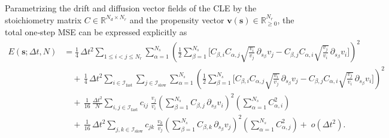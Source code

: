 \documentclass{article}
\begin{document}






Parametrizing the drift and diffusion vector fields of the CLE by the stoichiometry matrix
$C\in\mathbb{R}^{N_d\times N_r}$ and the propensity vector
$\pmb{v}(\pmb{s})\in\mathbb{R}_{\ge 0}^{N_r}$, the total one‑step MSE can be expressed explicitly as
\begin{equation}
\begin{aligned}
E(\pmb{s};\Delta t,N)&=
\frac14\,\Delta t^2
\sum_{1\le i<j\le N_r}
\sum_{\alpha=1}^{N_s}
\left(
\frac12\sum_{\beta=1}^{N_s}
\Big[
   C_{\beta,i}C_{\alpha,j}
   \sqrt{\tfrac{v_i}{v_j}}\,
   \partial_{s_\beta}v_j
 -
   C_{\beta,j}C_{\alpha,i}
   \sqrt{\tfrac{v_j}{v_i}}\,
   \partial_{s_\beta}v_i
\Big]
\right)^{\!2}
\\[6pt]
&\quad+\,
\frac14\,\Delta t^2
\sum_{i\in \mathcal{I}_{\mathrm{fast}}}\sum_{j\in \mathcal{I}_{\mathrm{slow}}}
\sum_{\alpha=1}^{N_s}
\left(
\frac12\sum_{\beta=1}^{N_s}
\Big[
   C_{\beta,i}C_{\alpha,j}
   \sqrt{\tfrac{v_i}{v_j}}\,
   \partial_{s_\beta}v_j
 -
   C_{\beta,j}C_{\alpha,i}
   \sqrt{\tfrac{v_j}{v_i}}\,
   \partial_{s_\beta}v_i
\Big]
\right)^{\!2}
\\[6pt]
&\quad+\,
\frac{1}{16}\,\frac{\Delta t^2}{N}
\sum_{i,j\in \mathcal{I}_{\mathrm{fast}}} c_{ij}\;
\frac{v_j}{v_i}
\left(
   \sum_{\beta=1}^{N_s} C_{\beta,j}\,\partial_{s_\beta}v_i
\right)^{\!2}
\left(
   \sum_{\alpha=1}^{N_s} C_{\alpha,i}^2
\right)
\\[6pt]
&\quad+\,
\frac{1}{16}\,\Delta t^2
\sum_{j,k\in \mathcal{I}_{\mathrm{slow}}} c_{jk}\;
\frac{v_k}{v_j}
\left(
   \sum_{\beta=1}^{N_s} C_{\beta,k}\,\partial_{s_\beta}v_j
\right)^{\!2}
\left(
   \sum_{\alpha=1}^{N_s} C_{\alpha,j}^2
\right)+\;o(\Delta t^2).
\end{aligned}
\end{equation}
\end{document}
